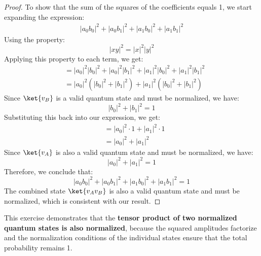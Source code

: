 \highspace
\begin{proof}
    To show that the sum of the squares of the coefficients equals 1, we start expanding the expression:
    \begin{align*}
        \left|a_0 b_0\right|^2 + \left|a_0 b_1\right|^2 + \left|a_1 b_0\right|^2 + \left|a_1 b_1\right|^2
    \end{align*}
    Using the property:
    \begin{equation*}
        \left|xy\right|^{2} = \left|x\right|^2 \left|y\right|^2
    \end{equation*}
    Applying this property to each term, we get:
    \begin{align*}
        &= \left|a_0\right|^2 \left|b_0\right|^2 + \left|a_0\right|^2 \left|b_1\right|^2 + \left|a_1\right|^2 \left|b_0\right|^2 + \left|a_1\right|^2 \left|b_1\right|^2 \\[.3em]
        &= \left|a_0\right|^2 \left(\left|b_0\right|^2 + \left|b_1\right|^2\right) + \left|a_1\right|^2 \left(\left|b_0\right|^2 + \left|b_1\right|^2\right)
    \end{align*}
    Since $\ket{v_{B}}$ is a valid quantum state and must be normalized, we have:
    \begin{equation*}
        \left|b_0\right|^2 + \left|b_1\right|^2 = 1
    \end{equation*}
    Substituting this back into our expression, we get:
    \begin{align*}
        &= \left|a_0\right|^2 \cdot 1 + \left|a_1\right|^2 \cdot 1 \\[.3em]
        &= \left|a_0\right|^2 + \left|a_1\right|^2
    \end{align*}
    Since $\ket{v_{A}}$ is also a valid quantum state and must be normalized, we have:
    \begin{equation*}
        \left|a_0\right|^2 + \left|a_1\right|^2 = 1
    \end{equation*}
    Therefore, we conclude that:
    \begin{equation*}
        \left|a_0 b_0\right|^2 + \left|a_0 b_1\right|^2 + \left|a_1 b_0\right|^2 + \left|a_1 b_1\right|^2 = 1
    \end{equation*}
    The combined state $\ket{v_{A}v_{B}}$ is also a valid quantum state and must be normalized, which is consistent with our result.
\end{proof}

\noindent
This exercise demonstrates that the \textbf{tensor product of two normalized quantum states is also normalized}, because the squared amplitudes factorize and the normalization conditions of the individual states ensure that the total probability remains 1.